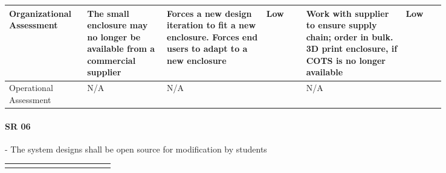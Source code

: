 \begin{landscape}
{\begin{longtable}{| p{0.12\linewidth} | p{0.16\linewidth} |  p{0.20\linewidth} | p{0.08\linewidth} | p{0.20\linewidth} | p{0.08\linewidth} |}
	\hline
	Organizational \newline Assessment & The small enclosure may no longer be available from a commercial supplier & Forces a new design iteration to fit a new enclosure. \newline Forces end users to adapt to a new enclosure & \cellcolor{green} Low & Work with supplier to ensure supply chain; order in bulk. \newline 3D print enclosure, if COTS is no longer available & \cellcolor{green} Low \\
	\hline
	Operational \newline Assessment & N/A & N/A & \cellcolor[gray]{0.8} & N/A & \cellcolor[gray]{0.8}
	\label{tab:sr05_feasibility}
\end{longtable}
}
\newpage




\paragraph*{SR 06} - The system designs shall be open source for modification by students

{\fontsize{8pt}{8pt}\selectfont
\begin{longtable}{| p{0.12\linewidth} | p{0.16\linewidth} |  p{0.20\linewidth} | p{0.08\linewidth} | p{0.20\linewidth} | p{0.08\linewidth} |}
	\hline \endlastfoot
	

\end{longtable}}
\end{landscape}

